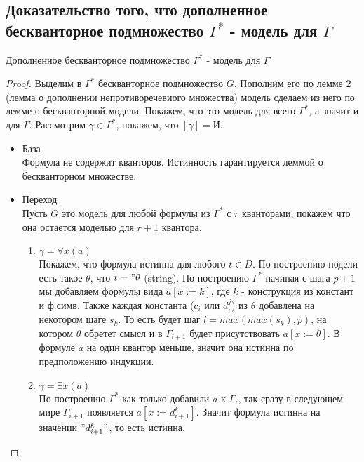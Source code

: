 \subsection{Доказательство того, что дополненное бескванторное подмножество $\Gamma^*$ - модель для $\Gamma$}
\label{sec-8-6}
\begin{theorem}
Дополненное бескванторное подмножество $\Gamma^*$ - модель для $\Gamma$
\end{theorem}
\begin{proof}
Выделим в $\Gamma^*$ бескванторное подмножество $G$. Пополним его по лемме 2 (лемма о дополнении непротиворечевиого множества) модель сделаем из него по лемме о бескванторной модели. Покажем, что это модель для всего $\Gamma^*$, а значит и для $\Gamma$. Рассмотрим $\gamma \in \Gamma^*$, покажем, что $[\gamma] = \texttt{И}$.
\begin{itemize}
\item База\\
Формула не содержит кванторов. Истинность гарантируется леммой о бескванторном множестве.
\item Переход\\
Пусть $G$ это модель для любой формулы из $\Gamma^*$ с $r$ кванторами, покажем что она остается моделью для $r+1$ квантора.
\begin{enumerate}
\item $\gamma = \forall x (a)$\\
Покажем, что формула истинна для любого $t \in D$. По построению подели есть такое $\theta$, что $t = "\theta$ (string). По построению $\Gamma^*$ начиная с шага $p+1$ мы добавляем формулы вида $a[x:=k]$, где $k$ - конструкция из констант и ф.симв. Также каждая константа ($c_i$ или $d_i^j$) из $\theta$ добавлена на некотором шаге $s_k$. То есть будет шаг $l=max(max(s_k), p)$, на котором $\theta$ обретет смысл и в $\Gamma_{l+1}$ будет присутствовать $a[x:=\theta]$. В формуле $a$ на один квантор меньше, значит она истинна по предположению индукции.
\item $\gamma = \exists x (a)$\\
По построению $\Gamma^*$ как только добавили $a$ к $\Gamma_i$, так сразу в следующем мире $\Gamma_{i+1}$ появляется $a[x:=d_{i+1}^k]$. Значит формула истинна на значении $"d_{i+1}^k"$, то есть истинна.
\end{enumerate}
\end{itemize}
\end{proof}
